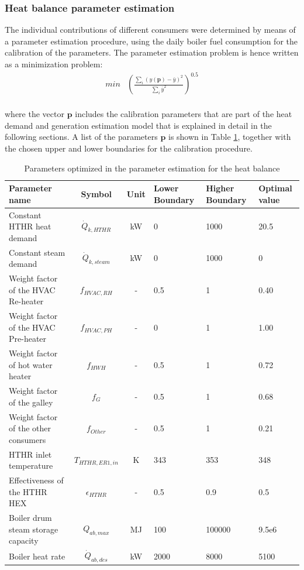 \documentclass[preprint,12pt]{elsarticle}
\begin{document}
\subsubsection{Heat balance parameter estimation}

The individual contributions of different consumers were determined by means of a parameter estimation procedure, using the daily boiler fuel consumption for the calibration of the parameters. The parameter estimation problem is hence written as a minimization problem:
\begin{eqnarray}
min &  \left(\frac{\sum_i(y(\textbf{p})-\bar{y})^2}{\sum_i \bar{y}^2}\right)^{0.5} \\
\end{eqnarray}

where the vector $\textbf{p}$ includes the calibration parameters that are part of the heat demand and generation estimation model that is explained in detail in the following sections. A list of the parameters $\textbf{p}$ is shown in Table \ref{tab:ParameterEstimation}, together with the chosen upper and lower boundaries for the calibration procedure.
\begin{table}
	\centering
	\begin{tabular}{p{3cm}ccp{1.6cm}p{1.6cm}p{1.2cm}}
		\hline 
		Parameter name & Symbol  & Unit & Lower Boundary & Higher Boundary & Optimal value \\ 
		\hline
		Constant HTHR heat demand	 & $\dot{Q}_{k,HTHR}$ & kW & 0 & 1000 & 20.5 \\ 
		Constant steam demand		 & $\dot{Q}_{k,steam}$ & kW & 0 & 1000 & 0 \\
		Weight factor of the HVAC Re-heater & $f_{HVAC,RH}$ & - & 0.5 & 1 & 0.40 \\ 
		Weight factor of the HVAC Pre-heater & $f_{HVAC,PH}$ & - & 0 & 1 & 1.00 \\ 
		Weight factor of hot water heater & $f_{HWH}$ & - & 0.5 & 1 & 0.72 \\ 
		Weight factor of the galley & $f_{G}$ & - & 0.5 & 1 & 0.68 \\ 
		Weight factor of the other consumers & $f_{Other}$ & - & 0.5 & 1 & 0.21 \\ 
		HTHR inlet temperature & $T_{HTHR,ER1,in}$ & K & 343 & 353 & 348 \\
		Effectiveness of the HTHR HEX & $\epsilon_{HTHR} $ & - & 0.5 & 0.9 & 0.5 \\
		Boiler drum steam storage capacity & $Q_{ab,max}$ & MJ & 100 & 100000 & 9.5e6 \\ 
		Boiler heat rate & $\dot{Q}_{ab,des}$ & kW & 2000 & 8000 & 5100 \\ 
		\hline
	\end{tabular}
	\caption{Parameters optimized in the parameter estimation for the heat balance}
	\label{tab:ParameterEstimation} 
\end{table}
\end{document}
